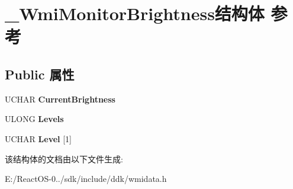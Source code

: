 \hypertarget{struct___wmi_monitor_brightness}{}\section{\+\_\+\+Wmi\+Monitor\+Brightness结构体 参考}
\label{struct___wmi_monitor_brightness}
\subsection*{Public 属性}
\begin{DoxyCompactItemize}
\item 
\mbox{\label{struct___wmi_monitor_brightness_a980932802f8635c81cb221219a659130}} 
U\+C\+H\+AR {\bfseries Current\+Brightness}
\item 
\mbox{\label{struct___wmi_monitor_brightness_a7507ef2a48dd96ce56d7cbe8db52fa8f}} 
U\+L\+O\+NG {\bfseries Levels}
\item 
\mbox{\label{struct___wmi_monitor_brightness_ae7be60afa27bd13ad5e19486cf48c316}} 
U\+C\+H\+AR {\bfseries Level} \mbox{[}1\mbox{]}
\end{DoxyCompactItemize}


该结构体的文档由以下文件生成\+:\begin{DoxyCompactItemize}
\item 
E\+:/\+React\+O\+S-\/0../sdk/include/ddk/wmidata.\+h\end{DoxyCompactItemize}
